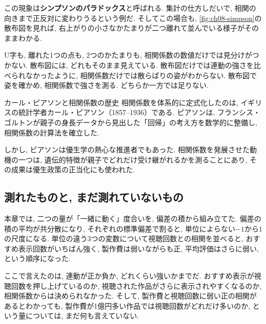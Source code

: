この現象は\textbf{シンプソンのパラドックス}と呼ばれる.
集計の仕方しだいで, 相関の向きまで正反対に変わりうるという例だ.
そしてこの場合も, \cref{fig:ch08-simpson}の散布図を見れば, 右上がりの小さなかたまりが二つ離れて並んでいる様子がそのままわかる.

\vspace{1em}

U字も, 離れた1つの点も, 2つのかたまりも, 相関係数の数値だけでは見分けがつかない.
散布図には, どれもそのまま見えている.
散布図だけでは連動の強さを比べられなかったように, 相関係数だけでは散らばりの姿がわからない.
散布図で姿を確かめ, 相関係数で強さを測る. どちらか一方では足りない.

\begin{mybox}{カール・ピアソンと相関係数の歴史}
相関係数を体系的に定式化したのは, イギリスの統計学者カール・ピアソン（1857--1936）である.\footnotemark
ピアソンは, フランシス・ゴルトンが親子の身長データから見出した「回帰」の考え方を数学的に整備し, 相関係数の計算法を確立した.

しかし, ピアソンは優生学の熱心な推進者でもあった.
相関係数を発展させた動機の一つは, 遺伝的特徴が親子でどれだけ受け継がれるかを測ることにあり, その成果は優生政策の正当化にも使われた.
\end{mybox}


\subsection{測れたものと, まだ測れていないもの}

本章では, 二つの量が「一緒に動く」度合いを, 偏差の積から組み立てた.
偏差の積の平均が共分散になり, それぞれの標準偏差で割ると, 単位によらない$-1$から$1$の尺度になる.
単位の違う3つの変数について視聴回数との相関を並べると, おすすめ表示回数がいちばん強く, 製作費は弱いながらも正, 平均評価はさらに弱い, という順序になった.

ここで言えたのは, 連動が正か負か, どれくらい強いかまでだ.
おすすめ表示が視聴回数を押し上げているのか, 視聴された作品がさらに表示されやすくなるのか, 相関係数からは決められなかった.
そして, 製作費と視聴回数に弱い正の相関があるとわかっても, 製作費が1億円多い作品では視聴回数がどれだけ多いのか, という量については, まだ何も言えていない.
